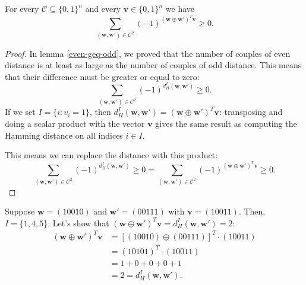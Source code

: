 \begin{lemma}
    \label{sum-greater-zero-lemma}
    For every $\mathcal{C} \subseteq \{0,1\}^n$ and every $\mathbf{v}\in\{0,1\}^n$ we have
    \begin{equation}
        \label{sum-almost-here}
        \sum_{(\mathbf{w}, \mathbf{w}')\in\mathcal{C}^2}(-1)^{(\textbf{w} \oplus \textbf{w}')^T\mathbf{v}} \geq 0.
    \end{equation}
    \begin{proof}
        In lemma \ref{even-geq-odd}, we proved that the number of couples of even distance is at least as large as the number of couples of odd distance. This means that their difference must be greater or equal to zero:
        \begin{equation}
            \label{evens-odd-geq-zero}
            \sum_{(\mathbf{w}, \mathbf{w}')\in\mathcal{C}^2}(-1)^{d_H^I(\mathbf{w}, \mathbf{w}')} \geq 0.
        \end{equation}
        If we set $I=\{i:v_i=1\}$, then $d_H^I(\mathbf{w}, \mathbf{w}') = (\textbf{w} \oplus \textbf{w}')^T\mathbf{v}$: transposing and doing a scalar product with the vector $\mathbf{v}$ gives the same result as computing the Hamming distance on all indices $i\in I$.

        This means we can replace the distance with this product:
        \begin{equation*}
            \sum_{(\mathbf{w}, \mathbf{w}')\in\mathcal{C}^2}(-1)^{d_H^I(\mathbf{w}, \mathbf{w}')} \geq 0
            =
            \sum_{(\mathbf{w}, \mathbf{w}')\in\mathcal{C}^2}(-1)^{(\textbf{w} \oplus \textbf{w}')^T\mathbf{v}} \geq 0.
        \end{equation*}
    \end{proof}
    \begin{example}
        Suppose $\mathbf{w}=(10010)$ and $\mathbf{w}'=(00111)$ with $\mathbf{v}=(10011)$.
        Then, $I = \{1,4,5\}$. Let's show that $(\textbf{w} \oplus \textbf{w}')^T\mathbf{v} = d_H^I(\mathbf{w}, \mathbf{w}') = 2$:
        \begin{equation*}
            \begin{array}{ll}
                (\textbf{w} \oplus \textbf{w}')^T\mathbf{v} & = [(10010) \oplus (00111)]^T \cdot (10011) \\
                 & = (10101)^T \cdot (10011) \\
                 & = 1+0+0+0+1 \\
                 & = 2 = d_H^I(\mathbf{w}, \mathbf{w}').
            \end{array}
        \end{equation*}
    \end{example}
        

\end{lemma}
